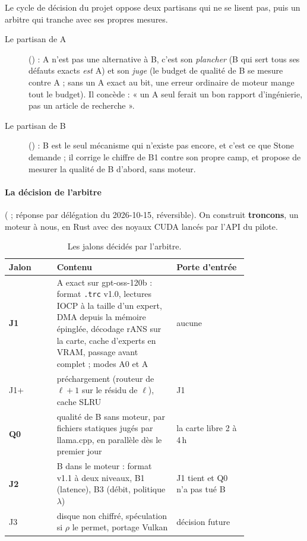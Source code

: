 Le cycle de décision du projet oppose deux partisans qui ne se lisent pas, puis un arbitre qui tranche avec ses propres mesures.
\begin{description}
\item[Le partisan de A] () : A n'est pas une alternative à B, c'est son \emph{plancher} (B qui sert tous ses défauts exacts \emph{est} A) et son \emph{juge} (le budget de qualité de B se mesure contre A ; sans un A exact au bit, une erreur ordinaire de moteur mange tout le budget). Il concède : « un A seul ferait un bon rapport d'ingénierie, pas un article de recherche ».
\item[Le partisan de B] () : B est le seul mécanisme qui n'existe pas encore, et c'est ce que Stone demande ; il corrige le chiffre de B1 contre son propre camp, et propose de mesurer la qualité de B d'abord, sans moteur.
\end{description}

\paragraph{La décision de l'arbitre} ( ; réponse par délégation du 2026-10-15, réversible). On construit \textbf{troncons}, un moteur à nous, en Rust avec des noyaux CUDA lancés par l'API du pilote.

\begin{table}[ht]
\centering\small
\caption[Les jalons décidés]{Les jalons décidés par l'arbitre.}
\label{tab:jalons}
\begin{tabular}{@{}lp{0.5\linewidth}p{0.3\linewidth}@{}}
\toprule
Jalon & Contenu & Porte d'entrée \\
\midrule
\textbf{J1} & A exact sur gpt-oss-120b : format \texttt{.trc} v1.0, lectures IOCP à la taille d'un expert, DMA depuis la mémoire épinglée, décodage rANS sur la carte, cache d'experts en VRAM, passage avant complet ; modes A0 et A & aucune \\
J1+ & préchargement (routeur de $\ell+1$ sur le résidu de $\ell$), cache SLRU & J1 \\
\textbf{Q0} & qualité de B sans moteur, par fichiers statiques jugés par llama.cpp, en parallèle dès le premier jour & la carte libre 2 à 4\,h \\
\textbf{J2} & B dans le moteur : format v1.1 à deux niveaux, B1 (latence), B3 (débit, politique $\lambda$) & J1 tient et Q0 n'a pas tué B \\
J3 & disque non chiffré, spéculation si $\rho$ le permet, portage Vulkan & décision future \\
\bottomrule
\end{tabular}
\end{table}

